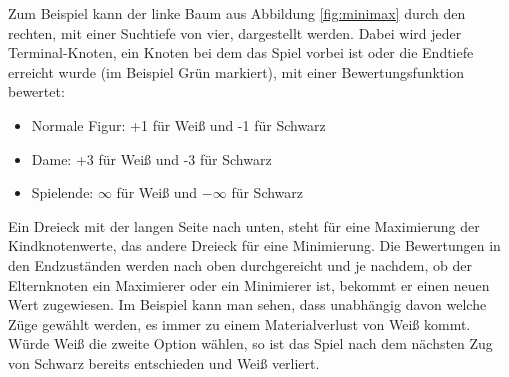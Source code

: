 \documentclass[12pt,a4paper,bibliography=totocnumbered,listof=totocnumbered]{article}
\begin{document}
Zum Beispiel kann der linke Baum aus Abbildung \ref{fig:minimax} durch den rechten, mit einer Suchtiefe von vier, dargestellt werden.
Dabei wird jeder Terminal-Knoten, ein Knoten bei dem das Spiel vorbei ist oder die Endtiefe erreicht wurde (im Beispiel Grün markiert), 
mit einer Bewertungsfunktion bewertet:
\begin{itemize}
    \item Normale Figur: +1 für Weiß und -1 für Schwarz
    \item Dame: +3 für Weiß und -3 für Schwarz
    \item Spielende: $\infty$ für Weiß und $-\infty$ für Schwarz
\end{itemize} 
Ein Dreieck mit der langen Seite nach unten, steht für eine Maximierung der Kindknotenwerte, das andere Dreieck für eine
Minimierung. Die Bewertungen in den Endzuständen werden nach oben durchgereicht und je nachdem, ob der Elternknoten ein Maximierer oder ein
Minimierer ist, bekommt er einen neuen Wert zugewiesen.
Im Beispiel kann man sehen, dass unabhängig davon welche Züge gewählt werden, es immer zu einem Materialverlust von Weiß kommt. Würde Weiß
die zweite Option wählen, so ist das Spiel nach dem nächsten Zug von Schwarz bereits entschieden und Weiß verliert. 
\end{document}
